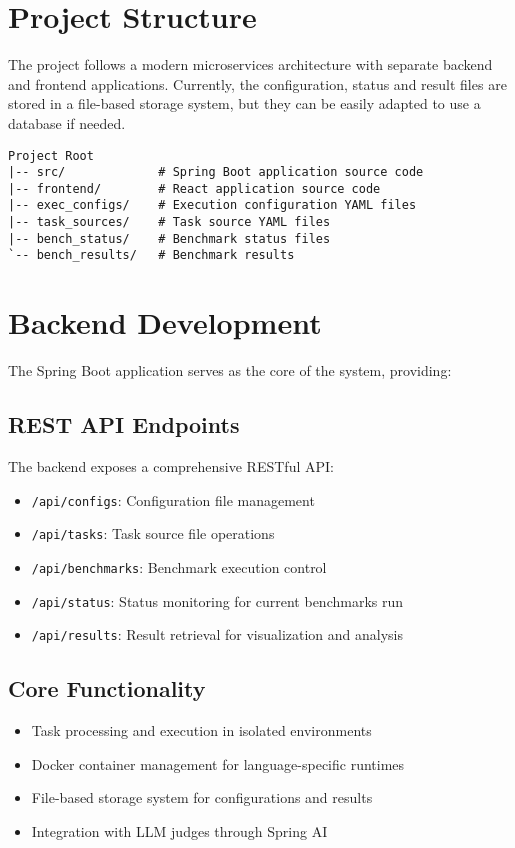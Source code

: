 \section{Project Structure}

The project follows a modern microservices architecture with separate backend and frontend applications.
Currently, the configuration, status and result files are stored in a file-based storage system, but they can be easily adapted to use a database if needed.

\begin{verbatim}
Project Root
|-- src/             # Spring Boot application source code
|-- frontend/        # React application source code
|-- exec_configs/    # Execution configuration YAML files
|-- task_sources/    # Task source YAML files
|-- bench_status/    # Benchmark status files
`-- bench_results/   # Benchmark results
\end{verbatim}

\section{Backend Development}

The Spring Boot application serves as the core of the system, providing:

\subsection{REST API Endpoints}
The backend exposes a comprehensive RESTful API:
\begin{itemize}
    \item \texttt{/api/configs}: Configuration file management
    \item \texttt{/api/tasks}: Task source file operations
    \item \texttt{/api/benchmarks}: Benchmark execution control
    \item \texttt{/api/status}: Status monitoring for current benchmarks run
    \item \texttt{/api/results}: Result retrieval for visualization and analysis
\end{itemize}

\subsection{Core Functionality}
\begin{itemize}
    \item Task processing and execution in isolated environments
    \item Docker container management for language-specific runtimes
    \item File-based storage system for configurations and results
    \item Integration with LLM judges through Spring AI
\end{itemize}

